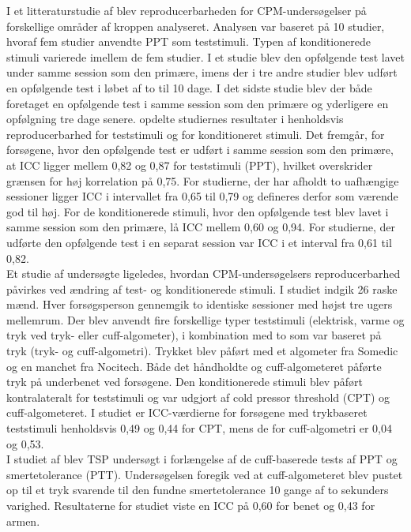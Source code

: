 I et litteraturstudie af  blev reproducerbarheden for CPM-undersøgelser på forskellige områder af kroppen analyseret. Analysen var baseret på 10 studier, hvoraf fem studier anvendte PPT som teststimuli. Typen af konditionerede stimuli varierede imellem de fem studier. I et studie blev den opfølgende test lavet under samme session som den primære, imens der i tre andre studier blev udført en opfølgende test i løbet af to til 10 dage. I det sidste studie blev der både foretaget en opfølgende test i samme session som den primære og yderligere en opfølgning tre dage senere.  opdelte studiernes resultater i henholdsvis reproducerbarhed for teststimuli og for konditioneret stimuli. Det fremgår, for forsøgene, hvor den opfølgende test er udført i samme session som den primære, at ICC ligger mellem 0,82 og 0,87 for teststimuli (PPT), hvilket overskrider grænsen for høj korrelation på 0,75. For studierne, der har afholdt to uafhængige sessioner ligger ICC i intervallet fra 0,65 til 0,79 og defineres derfor som værende god til høj. For de konditionerede stimuli, hvor den opfølgende test blev lavet i samme session som den primære, lå ICC mellem 0,60 og 0,94. For studierne, der udførte den opfølgende test i en separat session var ICC i et interval fra 0,61 til 0,82.\\ 
Et studie af  undersøgte ligeledes, hvordan CPM-undersøgelsers reproducerbarhed påvirkes ved ændring af test- og konditionerede stimuli. I studiet indgik 26 raske mænd. Hver forsøgsperson gennemgik to identiske sessioner med højst tre ugers mellemrum. Der blev anvendt fire forskellige typer teststimuli (elektrisk, varme og tryk ved tryk- eller cuff-algometer), i kombination med to som var baseret på tryk (tryk- og cuff-algometri). Trykket blev påført med et algometer fra Somedic og en manchet fra Nocitech. Både det håndholdte og cuff-algometeret påførte tryk på underbenet ved forsøgene. Den konditionerede stimuli blev påført kontralateralt for teststimuli og var udgjort af cold pressor threshold (CPT) og cuff-algometeret. I studiet er ICC-værdierne for forsøgene med trykbaseret teststimuli henholdsvis 0,49 og 0,44 for CPT, mens de for cuff-algometri er 0,04 og 0,53.\\ 
I studiet af  blev TSP undersøgt i forlængelse af de cuff-baserede tests af PPT og smertetolerance (PTT). Undersøgelsen foregik ved at cuff-algometeret blev pustet op til et tryk svarende til den fundne smertetolerance 10 gange af to sekunders varighed. Resultaterne for studiet viste en ICC på 0,60 for benet og 0,43 for armen. 

